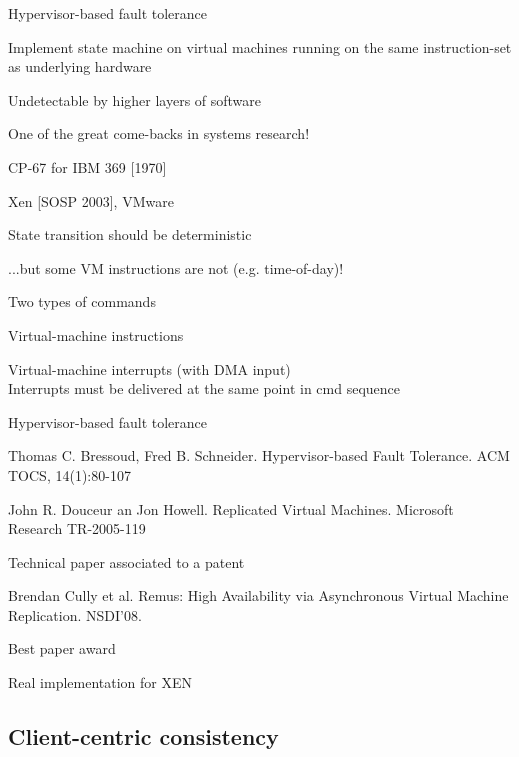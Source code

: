 \begin{frame}{Hypervisor-based fault tolerance}
	
\BIL
\item Implement state machine on \alert{virtual machines} running on the same instruction-set as underlying hardware
\item Undetectable by higher layers of software
\item One of the great come-backs in systems research!
	\BI
	\item CP-67 for IBM 369 [1970]
	\item Xen [SOSP 2003], VMware
	\EI
\item State transition should be deterministic
\item ...but some VM instructions are not (e.g. time-of-day)!
\item Two types of commands
	\BI
	\item Virtual-machine instructions
	\item Virtual-machine interrupts (with DMA input)\\
	Interrupts must be delivered at the same point in cmd sequence
	\EI
\EIL
	
\end{frame}

\begin{frame}{Hypervisor-based fault tolerance}

\BIL
\item Thomas C. Bressoud, Fred B. Schneider. Hypervisor-based Fault Tolerance. ACM TOCS, 14(1):80-107
\item John R. Douceur an Jon Howell. Replicated Virtual Machines.  Microsoft Research TR-2005-119
	\BI
	\item Technical paper associated to a patent
	\EI
\item Brendan Cully et al. Remus: High Availability via Asynchronous Virtual Machine Replication. NSDI'08.
\BI
\item Best paper award
\item Real implementation for XEN
\EI
\EIL

\end{frame}


\subsection{Client-centric consistency}

